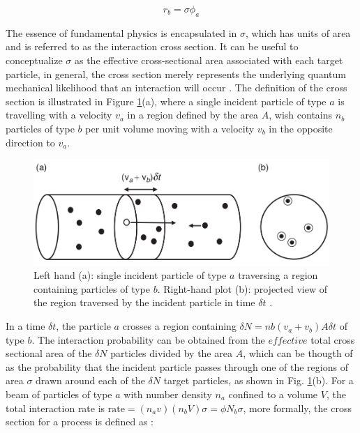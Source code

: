 \begin{equation*}
  r_{b}=\sigma \phi_{a}
\end{equation*}

The essence of fundamental physics is encapsulated in $\sigma$, which has units of area and is referred to as the interaction cross section. It can be useful to conceptualize $\sigma$ as the effective cross-sectional area associated with each target particle, in general, the cross section merely represents the underlying quantum mechanical likelihood that an interaction will occur \cite{thomson_2013}. The definition of the cross section is illustrated in Figure \ref{cross_section}(a), where a single incident particle of type $a$ is travelling with a velocity $v_{a}$ in a region defined by the area $A$, wish contains $n_{b}$ particles of type $b$ per unit volume moving with a velocity $v_{b}$ in the opposite direction to $v_{a}$. 

\begin{center}
  \begin{figure}[h!]
    \centering
\includegraphics[scale=.35]{Chapter1/cross_section.png} 
 \caption[Cross section illustration]{Left hand (a): single incident particle of type $a$ traversing a region containing particles of type $b$. Right-hand plot (b): projected view of the region traversed by the incident particle in time $\delta t$ \cite{thomson_2013}.}
    \label{cross_section}
  \end{figure}
\end{center}

In  a time $\delta t$, the particle $a$  crosses a region containing $\delta N= nb(v_{a}+v_{b}) A \delta t$ of type $b$. The interaction probability can be obtained from the $effective$ total cross sectional area of the $\delta N$ particles divided by the area $A$, which can be thougth of as the probability that the incident particle passes through one of the regions of area $\sigma$ drawn around each of the $\delta N$ target particles, as shown in Fig. \ref{cross_section}(b). For a beam of particles of type $a$ with number density $n_{a}$ confined to a volume $V$, the total interaction rate is $\text{rate}=(n_{a}v)(n_{b}V) \sigma = \phi N_{b} \sigma$,  more formally, the cross section for a process is defined as \cite{thomson_2013}:

